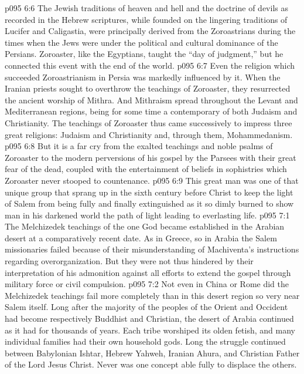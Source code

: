 \vs p095 6:6 The Jewish traditions of heaven and hell and the doctrine of devils as recorded in the Hebrew scriptures, while founded on the lingering traditions of Lucifer and Caligastia, were principally derived from the Zoroastrians during the times when the Jews were under the political and cultural dominance of the Persians. Zoroaster, like the Egyptians, taught the “day of judgment,” but he connected this event with the end of the world.
\vs p095 6:7 Even the religion which succeeded Zoroastrianism in Persia was markedly influenced by it. When the Iranian priests sought to overthrow the teachings of Zoroaster, they resurrected the ancient worship of Mithra. And Mithraism spread throughout the Levant and Mediterranean regions, being for some time a contemporary of both Judaism and Christianity. The teachings of Zoroaster thus came successively to impress three great religions: Judaism and Christianity and, through them, Mohammedanism.
\vs p095 6:8 \pc But it is a far cry from the exalted teachings and noble psalms of Zoroaster to the modern perversions of his gospel by the Parsees with their great fear of the dead, coupled with the entertainment of beliefs in sophistries which Zoroaster never stooped to countenance.
\vs p095 6:9 This great man was one of that unique group that sprang up in the sixth century before Christ to keep the light of Salem from being fully and finally extinguished as it so dimly burned to show man in his darkened world the path of light leading to everlasting life.
\vs p095 7:1 The Melchizedek teachings of the one God became established in the Arabian desert at a comparatively recent date. As in Greece, so in Arabia the Salem missionaries failed because of their misunderstanding of Machiventa’s instructions regarding overorganization. But they were not thus hindered by their interpretation of his admonition against all efforts to extend the gospel through military force or civil compulsion.
\vs p095 7:2 Not even in China or Rome did the Melchizedek teachings fail more completely than in this desert region so very near Salem itself. Long after the majority of the peoples of the Orient and Occident had become respectively Buddhist and Christian, the desert of Arabia continued as it had for thousands of years. Each tribe worshiped its olden fetish, and many individual families had their own household gods. Long the struggle continued between Babylonian Ishtar, Hebrew Yahweh, Iranian Ahura, and Christian Father of the Lord Jesus Christ. Never was one concept able fully to displace the others.
